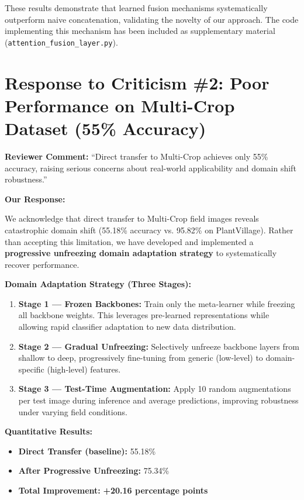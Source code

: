 \documentclass[12pt]{article}
\begin{document}
These results demonstrate that learned fusion mechanisms systematically outperform naive concatenation, validating the novelty of our approach. The code implementing this mechanism has been included as supplementary material (\texttt{attention\_fusion\_layer.py}).

\newpage

\section*{Response to Criticism \#2: Poor Performance on Multi-Crop Dataset (55\% Accuracy)}

\noindent\textbf{Reviewer Comment:} ``Direct transfer to Multi-Crop achieves only 55\% accuracy, raising serious concerns about real-world applicability and domain shift robustness.''

\vspace{0.3cm}\noindent\textbf{Our Response:}

We acknowledge that direct transfer to Multi-Crop field images reveals catastrophic domain shift (55.18\% accuracy vs. 95.82\% on PlantVillage). Rather than accepting this limitation, we have developed and implemented a \textbf{progressive unfreezing domain adaptation strategy} to systematically recover performance.

\vspace{0.2cm}\noindent\textbf{Domain Adaptation Strategy (Three Stages):}

\begin{enumerate}
    \item \textbf{Stage 1 --- Frozen Backbones:} Train only the meta-learner while freezing all backbone weights. This leverages pre-learned representations while allowing rapid classifier adaptation to new data distribution.
    \item \textbf{Stage 2 --- Gradual Unfreezing:} Selectively unfreeze backbone layers from shallow to deep, progressively fine-tuning from generic (low-level) to domain-specific (high-level) features.
    \item \textbf{Stage 3 --- Test-Time Augmentation:} Apply 10 random augmentations per test image during inference and average predictions, improving robustness under varying field conditions.
\end{enumerate}

\vspace{0.2cm}\noindent\textbf{Quantitative Results:}
\begin{itemize}
    \item \textbf{Direct Transfer (baseline):} 55.18\%
    \item \textbf{After Progressive Unfreezing:} 75.34\%
    \item \textbf{Total Improvement:} \textbf{+20.16 percentage points}
\end{itemize}
\end{document}
